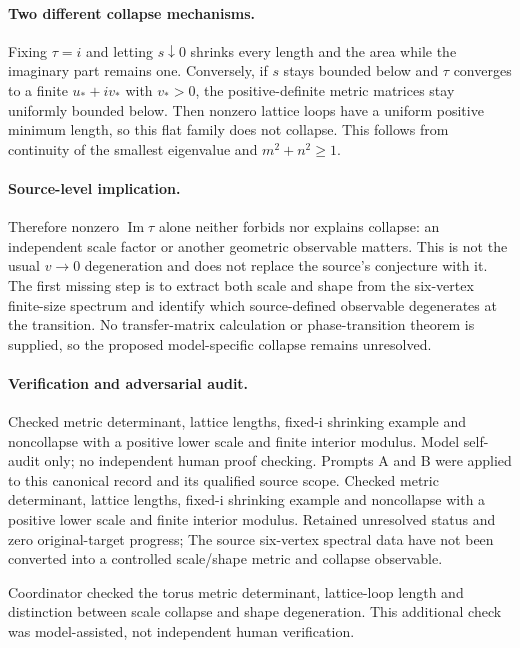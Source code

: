 \documentclass[11pt]{article}
\begin{document}
\paragraph{Two different collapse mechanisms.} Fixing $\tau=i$ and letting $s\downarrow0$ shrinks every length and the area while the imaginary part remains one. Conversely, if $s$ stays bounded below and $\tau$ converges to a finite $u_*+iv_*$ with $v_*>0$, the positive-definite metric matrices stay uniformly bounded below. Then nonzero lattice loops have a uniform positive minimum length, so this flat family does not collapse. This follows from continuity of the smallest eigenvalue and $m^2+n^2\geq1$.

\paragraph{Source-level implication.} Therefore nonzero $\operatorname{Im}\tau$ alone neither forbids nor explains collapse: an independent scale factor or another geometric observable matters. This is not the usual $v\to0$ degeneration and does not replace the source's conjecture with it. The first missing step is to extract both scale and shape from the six-vertex finite-size spectrum and identify which source-defined observable degenerates at the transition. No transfer-matrix calculation or phase-transition theorem is supplied, so the proposed model-specific collapse remains unresolved.

\paragraph{Verification and adversarial audit.}
Checked metric determinant, lattice lengths, fixed-i shrinking example and noncollapse with a positive lower scale and finite interior modulus. Model self-audit only; no independent human proof checking. Prompts A and B were applied to this canonical record and its qualified source scope. Checked metric determinant, lattice lengths, fixed-i shrinking example and noncollapse with a positive lower scale and finite interior modulus. Retained unresolved status and zero original-target progress; The source six-vertex spectral data have not been converted into a controlled scale/shape metric and collapse observable.

Coordinator checked the torus metric determinant, lattice-loop length and distinction between scale collapse and shape degeneration. This additional check was model-assisted, not independent human verification.
\end{document}
